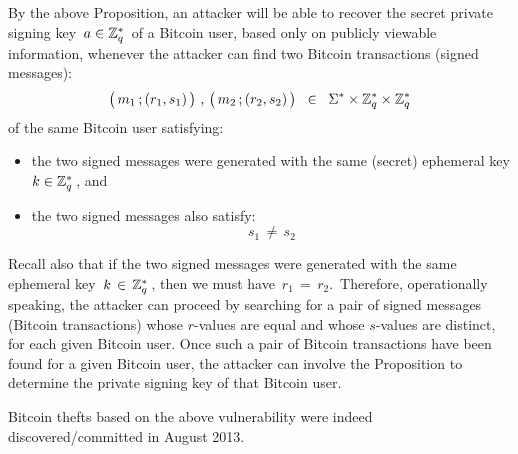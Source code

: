 \begin{remark}
\mbox{}
\vskip 0.1cm
\noindent
By the above Proposition, an attacker will be able to recover the secret
private signing key \,$a \in \mathbb{Z}_{q}^{*}$\, of a Bitcoin user, based only on
publicly viewable information, whenever the attacker can find two
Bitcoin transactions (signed messages):
\begin{equation*}
\left(\,m_{1}\,\overset{{\color{white}.}}{;}\,(r_{1},s_{1})\,\right)
\,,\,
\left(\,m_{2}\,\overset{{\color{white}.}}{;}\,(r_{2},s_{2})\,\right)
\;\; \in \;\;
	\Sigma^{*} \times \Z_{q}^{*} \times \Z_{q}^{*}
\end{equation*}
of the same Bitcoin user satisfying:
\begin{itemize}
\item
	the two signed messages were generated
	with the same (secret) ephemeral key $k \in \mathbb{Z}_{q}^{*}$\,,
	and
\item
	the two signed messages also satisfy:
	\begin{equation*}
	s_{1} \,\neq\, s_{2}
	\end{equation*}
\end{itemize}
Recall also that if the two signed messages were generated with the
same ephemeral key \,$k \,\in\, \mathbb{Z}_{q}^{*}$\,, then we must have
\,$r_{1} \,=\, r_{2}$.\,
Therefore, operationally speaking, the attacker can proceed by
searching for a pair of signed messages (Bitcoin transactions)
whose $r$-values are equal and whose $s$-values are distinct,
for each given Bitcoin user.
Once such a pair of Bitcoin transactions have been found
for a given Bitcoin user, the attacker can involve the
Proposition to determine the private signing key of that Bitcoin user.
\end{remark}

\begin{remark}
\mbox{}
\vskip 0.1cm
\noindent
Bitcoin thefts based on the above vulnerability were indeed discovered/committed
in August 2013.
\end{remark}

